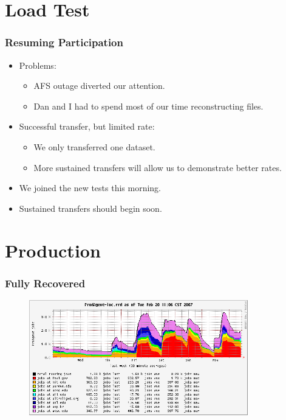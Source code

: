 \documentclass{beamer}
\begin{document}
\section{Load Test}
\begin{frame}
    \frametitle{Resuming Participation}
    \begin{itemize}
        \item Problems:
        \begin{itemize}
            \item AFS outage diverted our attention.
            \item Dan and I had to spend most of our time reconstructing files.
        \end{itemize}
        \item Successful transfer, but limited rate:
        \begin{itemize}
            \item We only transferred one dataset.
            \item More sustained transfers will allow us to demonstrate better rates.
        \end{itemize}
        \item We joined the new tests this morning.
        \item Sustained transfers should begin soon.
    \end{itemize}
\end{frame}

\section{Production}
\begin{frame}
    \frametitle{Fully Recovered}
    \begin{center}
    \begin{figure}
    \includegraphics*[height=5cm]{Graphics/ProdAgent-loc_1wk.png}
    \end{figure}
    \end{center}
\end{frame}
\end{document}
